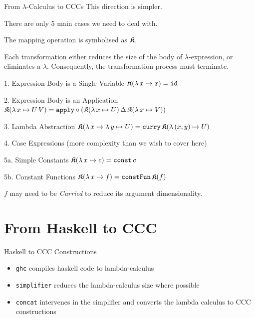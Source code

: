 \documentclass[10pt]{beamer}
\newcommand{\program}[1]{\texttt{#1}}
\newcommand{\id}{\mathtt{id}}
\newcommand{\apply}{\mathtt{apply}}
\newcommand{\curry}{\mathtt{curry}}
\newcommand{\lamf}[2]{\ensuremath{\lambda\, #1 \mapsto #2}}
\newcommand{\lamtoccc}[1]{\ensuremath{\frak{K}(#1)}}
\newcommand{\delprod}[2]{\ensuremath{#1\,\Delta\,#2}}
\newcommand{\const}{\ensuremath{\mathtt{const}}}
\newcommand{\constFun}{\ensuremath{\mathtt{constFun}}}
\theoremstyle{definition}
\theoremstyle{remark}
\numberwithin{equation}{section}
\begin{document}
\begin{frame}[fragile]{From $\lambda$-Calculus to CCCs}
  This direction is simpler.

  There are only 5 main cases we need to deal with.

  The mapping operation is symbolised as $\frak{K}$.

  Each transformation either reduces the size of the body of $\lambda$-expression,
  or eliminates a $\lambda$.
  Consequently, the transformation process must terminate.
\end{frame}

\begin{frame}[fragile]{1. Expression Body is a Single Variable}
  $\lamtoccc{\lamf{x}{x}} = \id$
\end{frame}

\begin{frame}[fragile]{2. Expression Body is an Application}
  $\lamtoccc{\lamf{x}{U\,V}} = \apply \circ (\delprod{\lamtoccc{\lamf{x}{U}}}{\lamtoccc{\lamf{x}{V}}})$
\end{frame}

\begin{frame}[fragile]{3. Lambda Abstraction}
  $\lamtoccc{\lamf{x}{\lamf{y}{U}}} = \curry\, \lamtoccc{\lamf{(x,y)}{U}}$
\end{frame}

\begin{frame}[fragile]{4. Case Expressions}
  (more complexity than we wish to cover here)
\end{frame}

\begin{frame}[fragile]{5a. Simple Constants}
  $\lamtoccc{\lamf{x}{c}} = \const\, c$
\end{frame}

\begin{frame}[fragile]{5b. Constant Functions}
  $\lamtoccc{\lamf{x}{f}} = \constFun\, \lamtoccc{f}$

  $f$ may need to be \emph{Curried} to reduce its argument dimensionality.
\end{frame}

\section{From Haskell to CCC} %

\begin{frame}[fragile]{Haskell to CCC Constructions}
  \begin{itemize}
    \item \program{ghc} compiles haskell code to lambda-calculus
    \item \program{simplifier} reduces the lambda-calculus size where possible
    \item \program{concat} intervenes in the simplifier and converts the lambda calculus to CCC constructions
  \end{itemize}
\end{frame}
\end{document}
